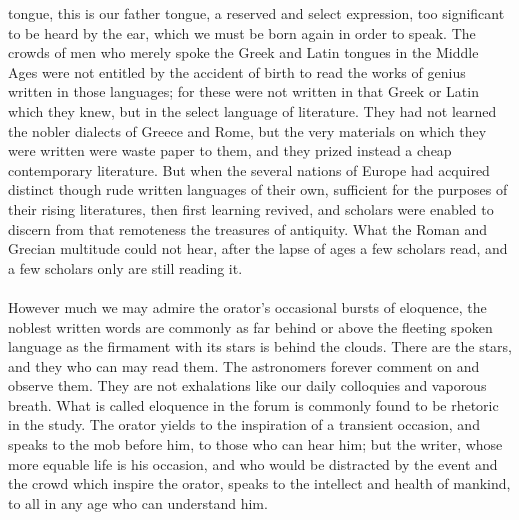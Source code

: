 \documentclass[letterpaper,12pt]{article}
\begin{document}
tongue, this is our father tongue, a reserved and select expression, too
significant to be heard by the ear, which we must be born again in order to
speak. The crowds of men who merely spoke the Greek and Latin tongues in the
Middle Ages were not entitled by the accident of birth to read the works of
genius written in those languages; for these were not written in that Greek or
Latin which they knew, but in the select language of literature. They had not
learned the nobler dialects of Greece and Rome, but the very materials on which
they were written were waste paper to them, and they prized instead a cheap
contemporary literature. But when the several nations of Europe had acquired
distinct though rude written languages of their own, sufficient for the purposes
of their rising literatures, then first learning revived, and scholars were
enabled to discern from that remoteness the treasures of antiquity. What the
Roman and Grecian multitude could not hear, after the lapse of ages a few
scholars read, and a few scholars only are still reading it.

\paragraph{}
However much we may admire the orator's occasional bursts of eloquence, the
noblest written words are commonly as far behind or above the fleeting spoken
language as the firmament with its stars is behind the clouds. There are the
stars, and they who can may read them. The astronomers forever comment on and
observe them. They are not exhalations like our daily colloquies and vaporous
breath. What is called eloquence in the forum is commonly found to be rhetoric
in the study. The orator yields to the inspiration of a transient occasion, and
speaks to the mob before him, to those who can hear him; but the writer, whose
more equable life is his occasion, and who would be distracted by the event and
the crowd which inspire the orator, speaks to the intellect and health of
mankind, to all in any age who can understand him.
\end{document}
